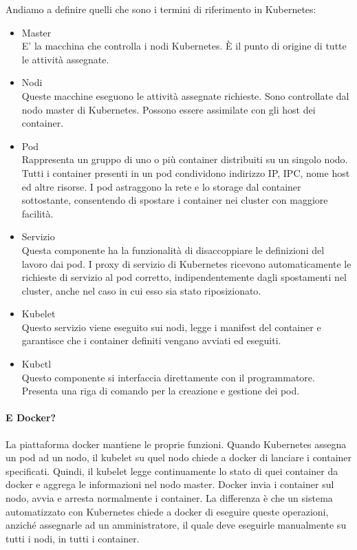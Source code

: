Andiamo a definire quelli che sono i termini di riferimento in Kubernetes:
\begin{itemize}
	\item Master \\
	E' la macchina che controlla i nodi Kubernetes. È il punto di origine di tutte le attività assegnate.
	\item Nodi \\
	Queste macchine eseguono le attività assegnate richieste. Sono controllate dal nodo master di Kubernetes. Possono essere assimilate con gli host dei container.
	\item Pod \\
	Rappresenta un gruppo di uno o più container distribuiti su un singolo nodo. Tutti i container presenti in un pod condividono indirizzo IP, IPC, nome host ed altre risorse. I pod astraggono la rete e lo storage dal container sottostante, consentendo di spostare i container nei cluster con maggiore facilità.
	\item Servizio \\
	Questa componente ha la funzionalità di disaccoppiare le definizioni del lavoro dai pod. I proxy di servizio di Kubernetes ricevono automaticamente le richieste di servizio al pod corretto, indipendentemente dagli spostamenti nel cluster, anche nel caso in cui esso sia stato riposizionato.
	\item Kubelet \\
	Questo servizio viene eseguito sui nodi, legge i manifest del container e garantisce che i container definiti vengano avviati ed eseguiti.
	\item Kubctl \\
	Questo componente si interfaccia direttamente con il programmatore. Presenta una riga di comando per la creazione e gestione dei pod.
\end{itemize}

\paragraph{E Docker?}
La piattaforma docker mantiene le proprie funzioni. Quando Kubernetes assegna un pod ad un nodo, il kubelet su quel nodo chiede a docker di lanciare i container specificati. Quindi, il kubelet legge continuamente lo stato di quei container da docker e aggrega le informazioni nel nodo master. Docker invia i container sul nodo, avvia e arresta normalmente i container. La differenza è che un sistema automatizzato con Kubernetes chiede a docker di eseguire queste operazioni, anziché assegnarle ad un amministratore, il quale deve eseguirle manualmente su tutti i nodi, in tutti i container.

